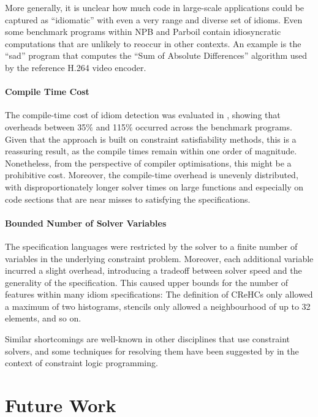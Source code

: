     More generally, it is unclear how much code in large-scale applications
    could be captured as ``idiomatic'' with even a very range and diverse set of
    idioms.
    Even some benchmark programs within NPB and Parboil contain idiosyncratic
    computations that are unlikely to reoccur in other contexts.
    An example is the ``sad'' program that computes the
    ``Sum of Absolute Differences'' algorithm used by the reference H.264 video
    encoder.

\paragraph*{Compile Time Cost}

    The compile-time cost of idiom detection was evaluated in
    , showing that overheads between 35$\%$ and 115$\%$
    occurred across the benchmark programs.
    Given that the approach is built on constraint satisfiability methods, this
    is a reassuring result, as the compile times remain within one order of
    magnitude.
    Nonetheless, from the perspective of compiler optimisations, this might be
    a prohibitive cost.
    Moreover, the compile-time overhead is unevenly distributed, with
    disproportionately longer solver times on large functions and especially on
    code sections that are near misses to satisfying the specifications.

    \paragraph*{Bounded Number of Solver Variables}
    The specification languages were restricted by the solver to a finite number
    of variables in the underlying constraint problem.
    Moreover, each additional variable incurred a slight overhead, introducing
    a tradeoff between solver speed and the generality of the specification.
    This caused upper bounds for the number of features within many idiom
    specifications:
    The definition of CReHCs only allowed a maximum of two histograms, stencils
    only allowed a neighbourhood of up to 32 elements, and so on.

    Similar shortcomings are well-known in other disciplines that use constraint
    solvers, and some techniques for resolving them have been suggested by
    \citet{Krings2016Constraint} in the context of constraint logic programming.

\section{Future Work}

